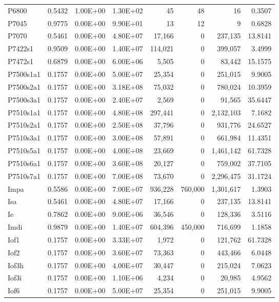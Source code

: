 \begin{longtable}{lrrrrrrr}
P6800 & 0.5432 & 1.00E+00 & 1.30E+02 & 45 & 48 & 16 & 0.3507 \\
P7045 & 0.9775 & 0.00E+00 & 9.90E+01 & 13 & 12 & 9 & 0.6828 \\
P7070 & 0.5461 & 0.00E+00 & 4.80E+07 & 17,166 & 0 & 237,135 & 13.8141 \\
P7422s1 & 0.9509 & 0.00E+00 & 1.40E+07 & 114,021 & 0 & 399,057 & 3.4999 \\
P7472s1 & 0.6879 & 0.00E+00 & 6.00E+06 & 5,505 & 0 & 83,442 & 15.1575 \\
P7500s1a1 & 0.1757 & 0.00E+00 & 5.00E+07 & 25,354 & 0 & 251,015 & 9.9005 \\
P7500s2a1 & 0.1757 & 0.00E+00 & 3.18E+08 & 75,032 & 0 & 780,024 & 10.3959 \\
P7500s3a1 & 0.1757 & 0.00E+00 & 2.40E+07 & 2,569 & 0 & 91,565 & 35.6447 \\
P7510s1a1 & 0.1757 & 0.00E+00 & 4.80E+08 & 297,441 & 0 & 2,132,103 & 7.1682 \\
P7510s2a1 & 0.1757 & 0.00E+00 & 2.50E+08 & 37,796 & 0 & 931,776 & 24.6527 \\
P7510s3a1 & 0.1757 & 0.00E+00 & 3.00E+08 & 57,891 & 0 & 661,984 & 11.4351 \\
P7510s5a1 & 0.1757 & 0.00E+00 & 4.00E+08 & 23,669 & 0 & 1,461,142 & 61.7328 \\
P7510s6a1 & 0.1757 & 0.00E+00 & 3.60E+08 & 20,127 & 0 & 759,002 & 37.7105 \\
P7510s7a1 & 0.1757 & 0.00E+00 & 7.00E+08 & 73,670 & 0 & 2,296,475 & 31.1724 \\
Impa & 0.5586 & 0.00E+00 & 7.00E+07 & 936,228 & 760,000 & 1,301,617 & 1.3903 \\
Isa & 0.5461 & 0.00E+00 & 4.80E+07 & 17,166 & 0 & 237,135 & 13.8141 \\
Ie & 0.7862 & 0.00E+00 & 9.00E+06 & 36,546 & 0 & 128,336 & 3.5116 \\
Imdi & 0.9879 & 0.00E+00 & 1.40E+07 & 604,396 & 450,000 & 716,699 & 1.1858 \\
Iof1 & 0.1757 & 0.00E+00 & 3.33E+07 & 1,972 & 0 & 121,762 & 61.7328 \\
Iof2 & 0.1757 & 0.00E+00 & 3.60E+07 & 73,363 & 0 & 443,466 & 6.0448 \\
Iof3h & 0.1757 & 0.00E+00 & 4.00E+07 & 30,447 & 0 & 215,024 & 7.0623 \\
Iof3i & 0.1757 & 0.00E+00 & 1.10E+06 & 4,234 & 0 & 20,985 & 4.9562 \\
Iof6 & 0.1757 & 0.00E+00 & 5.00E+07 & 25,354 & 0 & 251,015 & 9.9005 \\

\end{longtable}
